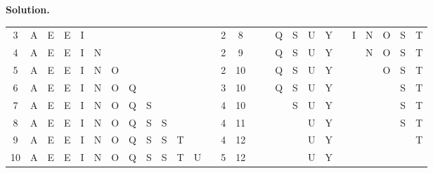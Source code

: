 \documentclass[12pt, a4paper]{article}
\newenvironment{sol}[1][Solution]
{\par\medskip\noindent \textbf{#1.} }
{\medskip}
\begin{document}
\begin{sol}
\begin{center}
{\begin{tabular}{c|cccccccccccc|cc|cccccc|cccccc}
				3 & {\color{gray} A} & {\color{gray}E} & {\color{gray}E} &{\color{red}I} & {} & {} & {} & {} & {} & {} & {} & {}
				& 2 & 8
				& {} & {} & Q & S & U & Y
				& {} & {\color{red}I} & N & O & S & T \\
				
				4 & {\color{gray} A} & {\color{gray}E} & {\color{gray}E} &{\color{gray}I} & {\color{red}N} & {} & {} & {} & {} & {} & {} & {}
				& 2 & 9
				& {} & {} & Q & S & U & Y
				& {} & {} & {\color{red}N} & O & S & T \\
				
				5 & {\color{gray} A} & {\color{gray}E} & {\color{gray}E} &{\color{gray}I} & {\color{gray}N} & {\color{red}O} & {} & {} & {} & {} & {} & {}
				& 2 & 10
				& {} & {} & Q & S & U & Y
				& {} & {} & {} & {\color{red}O} & S & T \\
				
				6 & {\color{gray} A} & {\color{gray}E} & {\color{gray}E} &{\color{gray}I} & {\color{gray}N} & {\color{gray}O} & {\color{red}Q} & {} & {} & {} & {} & {}
				& 3 & 10
				& {} & {} & {\color{red}Q} & S & U & Y
				& {} & {} & {} & {} & S & T \\
				
				7 & {\color{gray} A} & {\color{gray}E} & {\color{gray}E} &{\color{gray}I} & {\color{gray}N} & {\color{gray}O} & {\color{gray}Q} & {\color{red}S} & {} & {} & {} & {}
				& 4 & 10
				& {} & {} & {} & {\color{red}S} & U & Y
				& {} & {} & {} & {} & S & T \\
				
				8 & {\color{gray} A} & {\color{gray}E} & {\color{gray}E} &{\color{gray}I} & {\color{gray}N} & {\color{gray}O} & {\color{gray}Q} & {\color{gray}S} & {\color{red}S} & {} & {} & {}
				& 4 & 11
				& {} & {} & {} & {} & U & Y
				& {} & {} & {} & {} & {\color{red}S} & T \\
				
				9 & {\color{gray} A} & {\color{gray}E} & {\color{gray}E} &{\color{gray}I} & {\color{gray}N} & {\color{gray}O} & {\color{gray}Q} & {\color{gray}S} & {\color{gray}S} & {\color{red}T} & {} & {}
				& 4 & 12
				& {} & {} & {} & {} & U & Y
				& {} & {} & {} & {} & {} & {\color{red}T} \\
				
				10 & {\color{gray} A} & {\color{gray}E} & {\color{gray}E} &{\color{gray}I} & {\color{gray}N} & {\color{gray}O} & {\color{gray}Q} & {\color{gray}S} & {\color{gray}S} & {\color{gray}T} & {\color{red}U} & {}
				& 5 & 12
				& {} & {} & {} & {} & {\color{red}U} & Y
				& {} & {} & {} & {} & {} & {} \\
				

\end{tabular}}
\end{center}
\end{sol}
\end{document}
